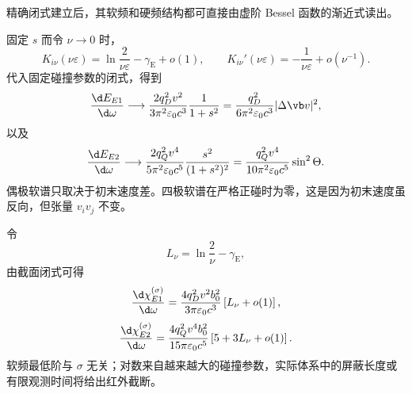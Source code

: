 精确闭式建立后，其软频和硬频结构都可直接由虚阶 Bessel 函数的渐近式读出。

固定 $s$ 而令 $\nu\to0$ 时，
\begin{equation*}
	K_{i\nu}(\nu\varepsilon)
	=\ln\frac{2}{\nu\varepsilon}-\gamma_{\mathrm E}+o(1),
	\qquad
	K_{i\nu}'(\nu\varepsilon)
	=-\frac{1}{\nu\varepsilon}+o(\nu^{-1}).
\end{equation*}
代入固定碰撞参数的闭式，得到
\begin{equation*}
	\frac{\d E_{E1}}{\d\omega}
	\longrightarrow
	\frac{2q_D^2v^2}{3\pi^2\varepsilon_0c^3}
	\frac{1}{1+s^2}
	=\frac{q_D^2}{6\pi^2\varepsilon_0c^3}|\Delta\vb v|^2,
\end{equation*}
以及
\begin{equation*}
	\frac{\d E_{E2}}{\d\omega}
	\longrightarrow
	\frac{2q_Q^2v^4}{5\pi^2\varepsilon_0c^5}
	\frac{s^2}{(1+s^2)^2}
	=\frac{q_Q^2v^4}{10\pi^2\varepsilon_0c^5}\sin^2\Theta.
\end{equation*}
偶极软谱只取决于初末速度差。四极软谱在严格正碰时为零，这是因为初末速度虽反向，但张量 $v_iv_j$ 不变。

令
\begin{equation*}
	L_\nu=\ln\frac{2}{\nu}-\gamma_{\mathrm E},
\end{equation*}
由截面闭式可得
\begin{equation*}
	\frac{\d\chi_{E1}^{(\sigma)}}{\d\omega}
	=\frac{4q_D^2v^2b_0^2}{3\pi\varepsilon_0c^3}
	\left[L_\nu+o(1)\right],
\end{equation*}
\begin{equation*}
	\frac{\d\chi_{E2}^{(\sigma)}}{\d\omega}
	=\frac{4q_Q^2v^4b_0^2}{15\pi\varepsilon_0c^5}
	\left[5+3L_\nu+o(1)\right].
\end{equation*}
软频最低阶与 $\sigma$ 无关；对数来自越来越大的碰撞参数，实际体系中的屏蔽长度或有限观测时间将给出红外截断。

